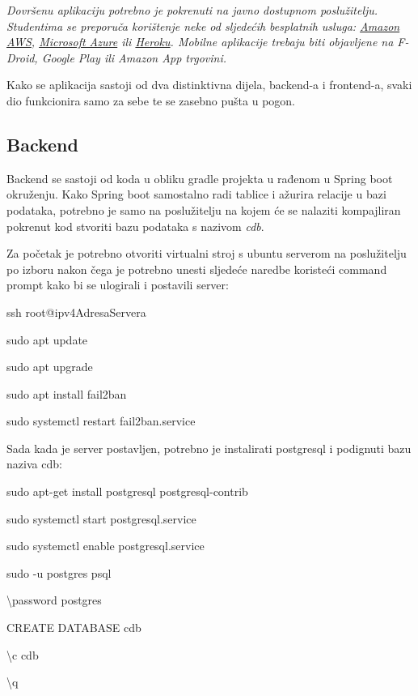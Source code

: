 			
			 \textit{Dovršenu aplikaciju potrebno je pokrenuti na javno dostupnom poslužitelju. Studentima se preporuča korištenje neke od sljedećih besplatnih usluga: \href{https://aws.amazon.com/}{Amazon AWS}, \href{https://azure.microsoft.com/en-us/}{Microsoft Azure} ili \href{https://www.heroku.com/}{Heroku}. Mobilne aplikacije trebaju biti objavljene na F-Droid, Google Play ili Amazon App trgovini.}

            {Kako se aplikacija sastoji od dva distinktivna dijela, backend-a i frontend-a, svaki dio funkcionira samo za sebe te se zasebno pušta u pogon.}

			\subsection{Backend}

                {Backend se sastoji od koda u obliku gradle projekta u rađenom u Spring boot okruženju. Kako Spring boot samostalno radi tablice i ažurira relacije u bazi podataka, potrebno je samo na poslužitelju na kojem će se nalaziti kompajliran pokrenut kod stvoriti bazu podataka s nazivom \textit{cdb}.}
                
                {Za početak je potrebno otvoriti virtualni stroj s ubuntu serverom na poslužitelju po izboru nakon čega je potrebno unesti sljedeće naredbe koristeći command prompt kako bi se ulogirali i postavili server:}

                \begin{packed_item}
        			\item {ssh root@ipv4AdresaServera}
        			\item {sudo apt update}
        			\item {sudo apt upgrade}
        			\item {sudo apt install fail2ban}
        			\item {sudo systemctl restart fail2ban.service}
        		\end{packed_item}

                {Sada kada je server postavljen, potrebno je instalirati postgresql i podignuti bazu naziva cdb:}

                \begin{packed_item}
        			\item {sudo apt-get install postgresql postgresql-contrib}
        			\item {sudo systemctl start postgresql.service}
        			\item {sudo systemctl enable postgresql.service}
        			\item {sudo -u postgres psql}
        			\item {\textbackslash password postgres}
        			\item {CREATE DATABASE cdb}
        			\item {\textbackslash c cdb}
        			\item {\textbackslash q}
        		\end{packed_item}

